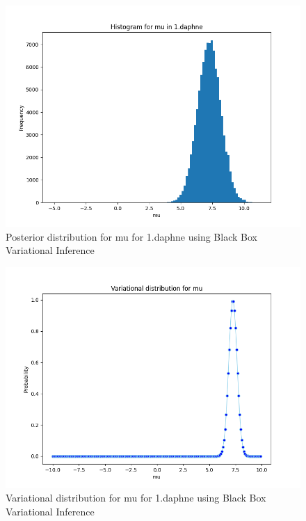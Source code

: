 \documentclass{article}
\begin{document}
\begin{enumerate}
\begin{figure}[!ht]
	\centering
	\includegraphics[scale=0.5]{../figs/1_daphne_histogram}
	\caption{Posterior distribution for mu for 1.daphne using Black Box Variational Inference}
\end{figure}

\begin{figure}[!ht]
	\centering
	\includegraphics[scale=0.5]{../figs/1_daphne_pdf}
	\caption{Variational distribution for mu for 1.daphne using Black Box Variational Inference}
\end{figure}


\end{enumerate}
\end{document}
